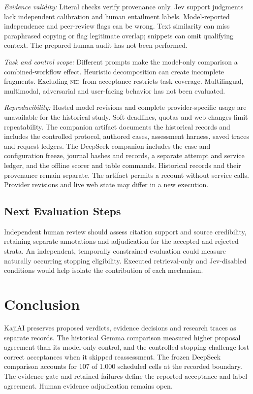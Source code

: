 \documentclass[conference]{IEEEtran}
\newcommand{\NEI}{\textsc{nei}}
\begin{document}
\textit{Evidence validity:} Literal checks verify provenance only. Jev support judgments lack independent calibration and human entailment labels. Model-reported independence and peer-review flags can be wrong. Text similarity can miss paraphrased copying or flag legitimate overlap; snippets can omit qualifying context. The prepared human audit has not been performed.

\textit{Task and control scope:} Different prompts make the model-only comparison a combined-workflow effect. Heuristic decomposition can create incomplete fragments. Excluding \NEI\ from acceptance restricts task coverage. Multilingual, multimodal, adversarial and user-facing behavior has not been evaluated.

\textit{Reproducibility:} Hosted model revisions and complete provider-specific usage are unavailable for the historical study. Soft deadlines, quotas and web changes limit repeatability. The companion artifact documents the historical records and includes the controlled protocol, authored cases, assessment harness, saved traces and request ledgers. The DeepSeek companion includes the case and configuration freeze, journal hashes and records, a separate attempt and service ledger, and the offline scorer and table commands. Historical records and their provenance remain separate. The artifact permits a recount without service calls. Provider revisions and live web state may differ in a new execution.

\subsection{Next Evaluation Steps}
Independent human review should assess citation support and source credibility, retaining separate annotations and adjudication for the accepted and rejected strata. An independent, temporally constrained evaluation could measure naturally occurring stopping eligibility. Executed retrieval-only and Jev-disabled conditions would help isolate the contribution of each mechanism.

\section{Conclusion}
KajiAI preserves proposed verdicts, evidence decisions and research traces as separate records. The historical Gemma comparison measured higher proposal agreement than its model-only control, and the controlled stopping challenge lost correct acceptances when it skipped reassessment. The frozen DeepSeek comparison accounts for 107 of 1,000 scheduled cells at the recorded boundary. The evidence gate and retained failures define the reported acceptance and label agreement. Human evidence adjudication remains open.
\end{document}
